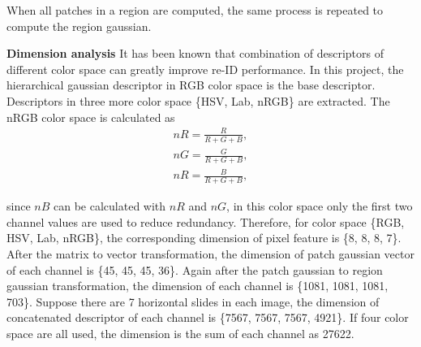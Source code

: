 When all patches in a region are computed, the same process is repeated to compute the region gaussian. 



\textbf{Dimension analysis} It has been known that combination of descriptors of different color space can greatly improve re-ID performance. In this project, the hierarchical gaussian descriptor in RGB color space is the base descriptor. Descriptors in three more color space \{HSV, Lab, nRGB\} are extracted. The nRGB color space is calculated as 
\begin{equation}
\begin{aligned}
nR = \frac{R}{R+G+B},\\
nG = \frac{G}{R+G+B},\\
nR = \frac{B}{R+G+B}, 
\end{aligned}
\end{equation}

since $nB$ can be calculated with $nR$ and $nG$, in this color space only the first two channel values are used to reduce redundancy. Therefore, for color space \{RGB, HSV, Lab, nRGB\}, the corresponding dimension of pixel feature is \{8, 8, 8, 7\}. After the matrix to vector transformation, the dimension of patch gaussian vector of each channel is \{45, 45, 45, 36\}. Again after the patch gaussian to region gaussian transformation, the dimension of each channel is \{1081, 1081, 1081, 703\}. Suppose there are 7 horizontal slides in each image, the dimension of concatenated descriptor of each channel is \{7567, 7567, 7567, 4921\}. If four color space are all used, the dimension is the sum of each channel as 27622. 


